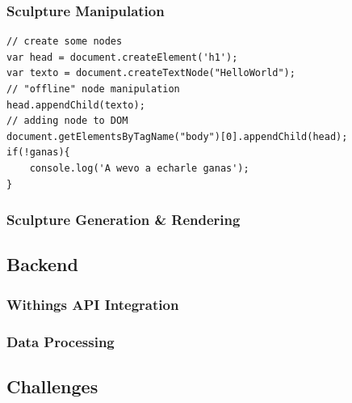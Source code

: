 \documentclass[../medieninformatik-arbeit.tex]{subfiles}
\begin{document}
\subsubsection{Sculpture Manipulation}
\begin{lstlisting}[style=htmlcssjs]
// create some nodes
var head = document.createElement('h1');
var texto = document.createTextNode("HelloWorld");
// "offline" node manipulation
head.appendChild(texto);
// adding node to DOM
document.getElementsByTagName("body")[0].appendChild(head);
if(!ganas){
	console.log('A wevo a echarle ganas');
}

\end{lstlisting}


\subsubsection{Sculpture Generation \& Rendering}
\label{sub:sculpturegeneration}
\subsection{Backend}
\subsubsection{Withings API Integration}
\label{sub:ApiIntegration}
\subsubsection{Data Processing}
\subsection{Challenges}
\end{document}
